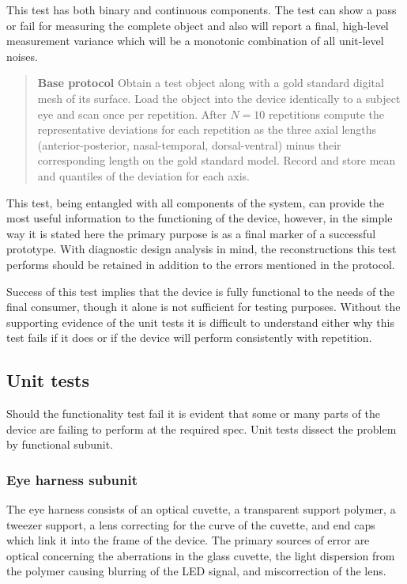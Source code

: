 \documentclass{article}
\begin{document}
This test has both binary and continuous components. The test can show a pass or fail for measuring the complete object and also will report a final, high-level measurement variance which will be a monotonic combination of all unit-level noises.

\begin{quotation}
\noindent\textbf{Base protocol} Obtain a test object along with a gold standard digital mesh of its surface. Load the object into the device identically to a subject eye and scan once per repetition. After $N = 10$ repetitions compute the representative deviations for each repetition as the three axial lengths (anterior-posterior, nasal-temporal, dorsal-ventral) minus their corresponding length on the gold standard model. Record and store mean and quantiles of the deviation for each axis.
\end{quotation}

This test, being entangled with all components of the system, can provide the most useful information to the functioning of the device, however, in the simple way it is stated here the primary purpose is as a final marker of a successful prototype. With diagnostic design analysis in mind, the reconstructions this test performs should be retained in addition to the errors mentioned in the protocol.

Success of this test implies that the device is fully functional to the needs of the final consumer, though it alone is not sufficient for testing purposes. Without the supporting evidence of the unit tests it is difficult to understand either why this test fails if it does or if the device will perform consistently with repetition.

\subsection{Unit tests}
\label{sec:unit-tests}

Should the functionality test fail it is evident that some or many parts of the device are failing to perform at the required spec. Unit tests dissect the problem by functional subunit.

\subsubsection{Eye harness subunit}
The eye harness consists of an optical cuvette, a transparent support polymer, a tweezer support, a lens correcting for the curve of the cuvette, and end caps which link it into the frame of the device. The primary sources of error are optical concerning the aberrations in the glass cuvette, the light dispersion from the polymer causing blurring of the LED signal, and miscorrection of the lens.
\end{document}
